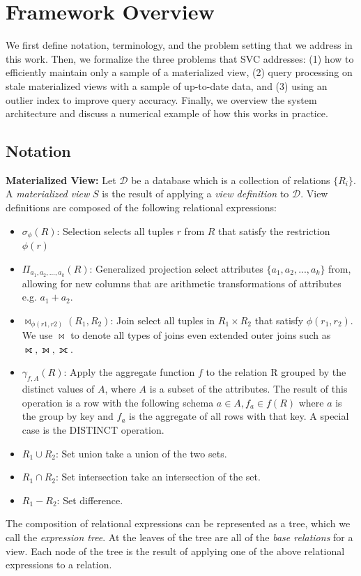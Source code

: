 \section{Framework Overview}\label{sec-arch}
We first define notation, terminology, and the problem setting that we address in this work.
Then, we formalize the three problems that SVC addresses: (1) how to efficiently maintain only a sample of a materialized view, (2) query processing on stale materialized views with a sample of up-to-date data, and (3) using an outlier index to improve query accuracy.
Finally, we overview the system architecture and discuss a numerical example of how this works in practice.

\subsection{Notation}\label{notation}
\noindent \textbf{Materialized View:} Let $\mathcal{D}$ be a database which is a collection of relations $\{R_i\}$. A \emph{materialized view} $S$ is the result of applying a \emph{view definition} to $\mathcal{D}$. 
View definitions are composed of the following relational expressions:
\begin{itemize}[noitemsep] \sloppy
	\item $\sigma_{\phi}(R)$: Selection selects all tuples $r$ from $R$ that satisfy the restriction $\phi (r)$ 
	\item $\Pi_{a_1,a_2,...,a_k}(R)$: Generalized projection select attributes $\{a_1,a_2,...,a_k\}$ from, allowing for new columns that are arithmetic transformations of attributes e.g. $a_1+a_2$.
	\item $\bowtie_{\phi (r1,r2)}(R_1,R_2)$: Join select all tuples in $R_1 \times R_2$ that satisfy $\phi (r_1,r_2)$. We use $\bowtie$ to denote all types of joins even extended outer joins such as $\rightouterjoin,\leftouterjoin,\fullouterjoin$.
	\item $\gamma_{f,A}(R)$: Apply the aggregate function $f$ to the relation R grouped by the distinct values of $A$, where $A$ is a subset of the attributes. The result of this operation is a row with the following schema $a \in A, f_a \in f(R)$ where $a$ is the group by key and $f_a$ is the aggregate of all rows with that key.  A special case is the DISTINCT operation. 
	\item $R_1 \cup R_2$: Set union take a union of the two sets.
	\item $R_1 \cap R_2$: Set intersection take an intersection of the set.
	\item $R_1 - R_2$: Set difference.
\end{itemize}
The composition of relational expressions can be represented as a tree, which we call the \emph{expression tree}.
At the leaves of the tree are all of the \emph{base relations} for a view.
Each node of the tree is the result of applying one of the above relational expressions to a relation.

